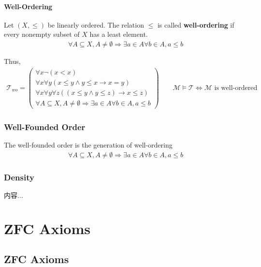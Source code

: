 \documentclass[Total.tex]{subfiles}
\begin{document}
			\subsubsection{Well-Ordering}
			
			\begin{Def}
				Let $(X,\leq)$ be linearly ordered. The relation $\leq$ is called \textbf{well-ordering} if every nonempty subset of $X$ has a least element. 
				\begin{gather*}
					\forall A\subseteq X,A\not=\emptyset\Rightarrow \exists a\in A\forall b\in A,a\leq b
				\end{gather*}
				
				Thus,
				\begin{gather*}
					\mathcal{T}_{wo}=\begin{pmatrix}
						\forall x \neg(x<x)\\
						\forall x\forall y(x\leq y\wedge y\leq x\rightarrow x=y)\\
						\forall x\forall y\forall z((x\leq y\wedge y\leq z)\rightarrow x\leq z)\\
						\forall A\subseteq X,A\not=\emptyset\Rightarrow \exists a\in A\forall b\in A,a\leq b
					\end{pmatrix}\qquad \mathcal{M}\models  \mathcal{T}\Leftrightarrow \mathcal{M}\mbox{ is well-ordered}
				\end{gather*}
			\end{Def}
		\subsection{Well-Founded Order}
			\begin{Def}
				The well-founded order is the generation of well-ordering
				\begin{gather*}
					\forall A\subseteq X,A\not=\emptyset\Rightarrow \exists a\in A\forall b\in A,a\leq b
				\end{gather*}
			\end{Def}
			
		\subsection{Density}
			\begin{Def}
				内容...
			\end{Def}
	\chapter{ZFC Axioms}
		\section{ZFC Axioms}
			
\end{document}
